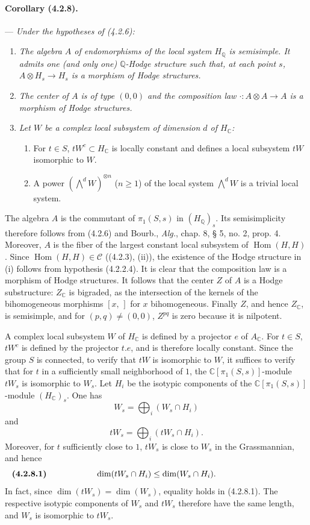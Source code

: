 \documentclass[10pt]{article}
\newcommand{\C}{\mathbb C}
\newcommand{\Q}{\mathbb Q}
\newcommand{\Hom}{\operatorname{Hom}}
\begin{document}
\paragraph{Corollary (4.2.8).} --- {\itshape Under the hypotheses of (4.2.6):}
\begin{enumerate}[label=(\roman*)]
\item {\itshape The algebra $A$ of endomorphisms of the local system $H_\Q$ is semisimple. It admits one (and only one) $\Q$-Hodge structure such that, at each point $s$, $A\otimes H_s\to H_s$ is a morphism of Hodge structures.}
\item {\itshape The center of $A$ is of type $(0,0)$ and the composition law $\cdot : A\otimes A\to A$ is a morphism of Hodge structures.}
\item {\itshape Let $W$ be a complex local subsystem of dimension $d$ of $H_\C$:
\begin{enumerate}[label=\alph*)]
\item For $t\in S$, $tW^c\subset H_\C$ is locally constant and defines a local subsystem $tW$ isomorphic to $W$.
\item A power $(\bigwedge^dW)^{\otimes n}$ ($n\ge1$) of the local system $\bigwedge^dW$ is a trivial local system.
\end{enumerate}}
\end{enumerate}

The algebra $A$ is the commutant of $\pi_1(S,s)$ in $(H_\Q)_s$. Its semisimplicity therefore follows from (4.2.6) and Bourb., \textit{Alg.}, chap. 8, § 5, no. 2, prop. 4. Moreover, $A$ is the fiber of the largest constant local subsystem of $\Hom(H,H)$. Since $\Hom(H,H)\in\mathcal C$ ((4.2.3), (ii)), the existence of the Hodge structure in (i) follows from hypothesis (4.2.2.4). It is clear that the composition law is a morphism of Hodge structures. It follows that the center $Z$ of $A$ is a Hodge substructure: $Z_\C$ is bigraded, as the intersection of the kernels of the bihomogeneous morphisms $[x,\,]$ for $x$ bihomogeneous. Finally $Z$, and hence $Z_\C$, is semisimple, and for $(p,q)\ne(0,0)$, $Z^{pq}$ is zero because it is nilpotent.

A complex local subsystem $W$ of $H_\C$ is defined by a projector $e$ of $A_\C$. For $t\in S$, $tW^c$ is defined by the projector $t.e$, and is therefore locally constant. Since the group $S$ is connected, to verify that $tW$ is isomorphic to $W$, it suffices to verify that for $t$ in a sufficiently small neighborhood of $1$, the $\C[\pi_1(S,s)]$-module $tW_s$ is isomorphic to $W_s$. Let $H_i$ be the isotypic components of the $\C[\pi_1(S,s)]$-module $(H_\C)_s$. One has
\[
W_s=\bigoplus_i(W_s\cap H_i)
\]
and
\[
tW_s=\bigoplus_i(tW_s\cap H_i).
\]
Moreover, for $t$ sufficiently close to $1$, $tW_s$ is close to $W_s$ in the Grassmannian, and hence
\[
\makebox[\textwidth][s]{\textbf{(4.2.8.1)}\hfill$\displaystyle \dim(tW_s\cap H_i)\le \dim(W_s\cap H_i).$\hfill\phantom{\textbf{(4.2.8.1)}}}
\]
In fact, since $\dim(tW_s)=\dim(W_s)$, equality holds in (4.2.8.1). The respective isotypic components of $W_s$ and $tW_s$ therefore have the same length, and $W_s$ is isomorphic to $tW_s$.
\end{document}
